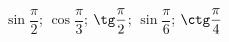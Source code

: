 \begin{ex}[type=calculate]
	\begin{condition}
		\( \sin\dfrac{\pi}{2} \); \( \cos\dfrac{\pi}{3} \); \( \tg\dfrac{\pi}{2} \); \( \sin\dfrac{\pi}{6} \); \( \ctg\dfrac{\pi}{4} \)
	\end{condition}
\end{ex}